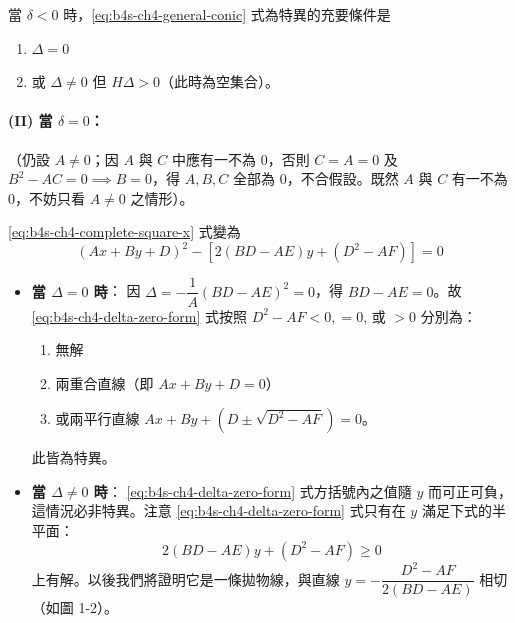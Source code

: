 \begin{proposition}
當 $\delta < 0$ 時，\eqref{eq:b4s-ch4-general-conic} 式為特異的充要條件是
\begin{enumerate}[(1)]
  \item $\Delta = 0$
  \item 或 $\Delta \ne 0$ 但 $H\Delta > 0$（此時為空集合）。
\end{enumerate}
\end{proposition}

\paragraph*{(II) 當 $\delta = 0$：} （仍設 $A \ne 0$；因 $A$ 與 $C$ 中應有一不為 0，否則 $C = A = 0$ 及 $B^2 - AC = 0 \implies B = 0$，得 $A, B, C$ 全部為 0，不合假設。既然 $A$ 與 $C$ 有一不為 0，不妨只看 $A \ne 0$ 之情形）。

\eqref{eq:b4s-ch4-complete-square-x} 式變為
\begin{equation}
(Ax + By + D)^2 - [2(BD - AE)y + (D^2 - AF)] = 0
\label{eq:b4s-ch4-delta-zero-form}
\end{equation}

\begin{itemize}
  \item[(i)] \textbf{當 $\Delta = 0$ 時}：
  因 $\Delta = -\dfrac{1}{A}(BD - AE)^2 = 0$，得 $BD - AE = 0$。故 \eqref{eq:b4s-ch4-delta-zero-form} 式按照 $D^2 - AF < 0, = 0$, 或 $> 0$ 分別為：
  \begin{enumerate}[(1)]
    \item 無解
    \item 兩重合直線（即 $Ax + By + D = 0$）
    \item 或兩平行直線 $Ax + By + (D \pm \sqrt{D^2 - AF}) = 0$。
  \end{enumerate}
  此皆為特異。

  \item[(ii)] \textbf{當 $\Delta \ne 0$ 時}：
  \eqref{eq:b4s-ch4-delta-zero-form} 式方括號內之值隨 $y$ 而可正可負，這情況必非特異。注意 \eqref{eq:b4s-ch4-delta-zero-form} 式只有在 $y$ 滿足下式的半平面：
  \[
  2(BD - AE)y + (D^2 - AF) \ge 0
  \]
  上有解。以後我們將證明它是一條拋物線，與直線 $y = -\dfrac{D^2 - AF}{2(BD - AE)}$ 相切（如圖 1-2）。
\end{itemize}

